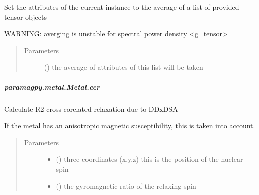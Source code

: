 \documentclass[a4paper,10pt,english,openany,oneside]{sphinxmanual}
\begin{document}
\begin{fulllineitems}
\begin{fulllineitems}
\begin{fulllineitems}
\label{\detokenize{reference/generated/paramagpy.metal.Metal.average:paramagpy.metal.Metal.average}}
Set the attributes of the current instance to the average
of a list of provided tensor objects

WARNING: averging is unstable for spectral power density \textless{}g\_tensor\textgreater{}
\begin{quote}\begin{description}
\item[{Parameters}] \leavevmode
{} () \textendash{} the average of attributes of this list will be taken

\end{description}\end{quote}

\end{fulllineitems}



\subparagraph{paramagpy.metal.Metal.ccr}
\label{\detokenize{reference/generated/paramagpy.metal.Metal.ccr:paramagpy-metal-metal-ccr}}\label{\detokenize{reference/generated/paramagpy.metal.Metal.ccr::doc}}

\begin{fulllineitems}
\label{\detokenize{reference/generated/paramagpy.metal.Metal.ccr:paramagpy.metal.Metal.ccr}}
Calculate R2 cross-corelated relaxation due to DDxDSA

If the metal has an anisotropic magnetic susceptibility, this is
taken into account.
\begin{quote}\begin{description}
\item[{Parameters}] \leavevmode\begin{itemize}
\item {} 
 () \textendash{} three coordinates (x,y,z)
this is the position of the nuclear spin

\item {} 
 () \textendash{} the gyromagnetic ratio of the relaxing spin


\end{itemize}
\end{description}
\end{quote}
\end{fulllineitems}
\end{fulllineitems}
\end{fulllineitems}
\end{document}
